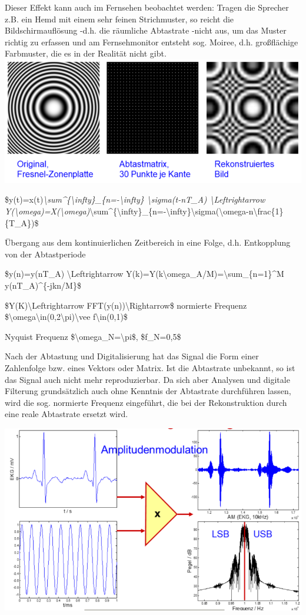 \documentclass[a4paper]{article}
\begin{document}
\begin{multicols}{3}
  Dieser Effekt kann auch im Fernsehen beobachtet werden: Tragen die
  Sprecher z.B. ein Hemd mit einem sehr feinen Strichmuster, so reicht die
  Bildschirmauflösung -d.h. die räumliche Abtastrate -nicht aus, um das
  Muster richtig zu erfassen und am Fernsehmonitor entsteht sog. Moiree,
  d.h. großflächige Farbmuster, die es in der Realität nicht gibt.
  \includegraphics[width=.5\linewidth]{Assets/Biosignalverarbeitung-abtastung-rekonstruktion.png}

  \begin{itemize*}
    \item \$y(t)=x(t)\emph{\textbackslash sum\^{}\{\textbackslash infty\}\_\{n=-\textbackslash infty\} \textbackslash sigma(t-nT\_A) \textbackslash Leftrightarrow Y(\textbackslash omega)=X(\textbackslash omega)}\textbackslash sum\^{}\{\textbackslash infty\}\_\{n=-\textbackslash infty\}\textbackslash sigma(\textbackslash omega-n\textbackslash frac\{1\}\{T\_A\})\$
    \item Übergang aus dem kontinuierlichen Zeitbereich in eine Folge, d.h. Entkopplung von der Abtastperiode
    \item \$y(n)=y(nT\_A) \textbackslash Leftrightarrow Y(k)=Y(k\textbackslash omega\_A/M)=\textbackslash sum\_\{n=1\}\^{}M y(nT\_A)\^{}\{-jkn/M\}\$
    \item \$Y(K)\textbackslash Leftrightarrow FFT(y(n))\textbackslash Rightarrow\$ normierte Frequenz \$\textbackslash omega\textbackslash in(0,2\textbackslash pi)\textbackslash vee f\textbackslash in(0,1)\$
    \item Nyquist Frequenz \$\textbackslash omega\_N=\textbackslash pi\$, \$f\_N=0,5\$
    \item Nach der Abtastung und Digitalisierung hat das Signal die Form einer Zahlenfolge bzw. eines Vektors oder Matrix. Ist die Abtastrate unbekannt, so ist das Signal auch nicht mehr reproduzierbar. Da sich aber Analysen und digitale Filterung grundsätzlich auch ohne Kenntnis der Abtastrate durchführen lassen, wird die sog. normierte Frequenz eingeführt, die bei der Rekonstruktion durch eine reale Abtastrate ersetzt wird.
  \end{itemize*}

  \includegraphics[width=.5\linewidth]{Assets/Biosignalverarbeitung-amplitudenmodulation.png}


\end{multicols}
\end{document}
